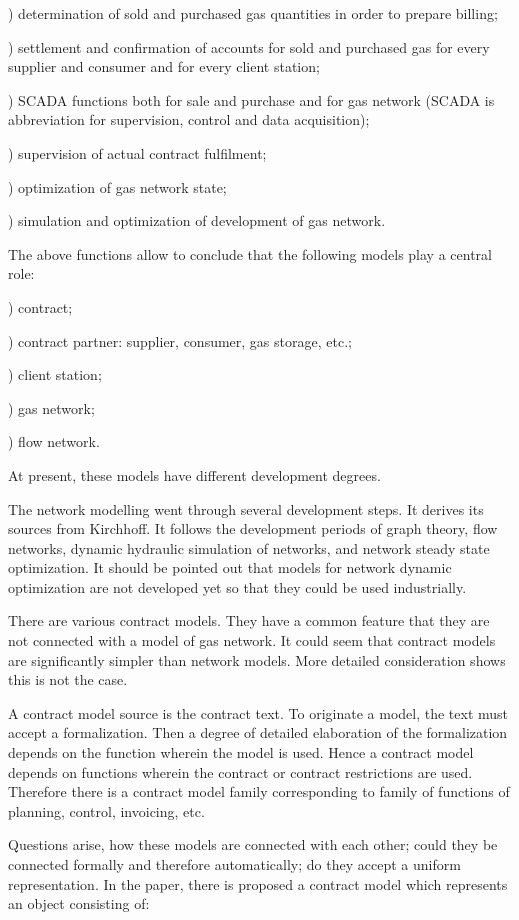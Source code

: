 \documentclass{article}
\begin{document}
) determination of sold and purchased gas quantities in order to
prepare billing;

) settlement and confirmation of accounts for sold and purchased gas
for every supplier and consumer and for every client station;

) SCADA functions both for sale and purchase and for gas network
(SCADA is abbreviation for supervision, control and data acquisition);

) supervision of actual contract fulfilment;

) optimization of gas network state;

) simulation and optimization of development of gas network.

The above functions allow to conclude that the following models play a
central role:

) contract;

) contract partner: supplier, consumer, gas storage, etc.;

) client station;

) gas network;

) flow network.

At present, these models have different development degrees.

The network modelling went through several development steps. It derives its
sources from Kirchhoff. It follows the development periods of graph theory,
flow networks, dynamic hydraulic simulation of networks, and network steady
state optimization. It should be pointed out that models for network dynamic
optimization are not developed yet so that they could be used industrially.

There are various contract models. They have a common feature that they are
not connected with a model of gas network. It could seem that contract
models are significantly simpler than network models. More detailed
consideration shows this is not the case.

A contract model source is the contract text. To originate a model, the text
must accept a formalization. Then a degree of detailed elaboration of the
formalization depends on the function wherein the model is used. Hence a
contract model depends on functions wherein the contract or contract
restrictions are used. Therefore there is a contract model family
corresponding to family of functions of planning, control, invoicing, etc.

Questions arise, how these models are connected with each other; could they
be connected formally and therefore automatically; do they accept a uniform
representation. In the paper, there is proposed a contract model which
represents an object consisting of:
\end{document}
